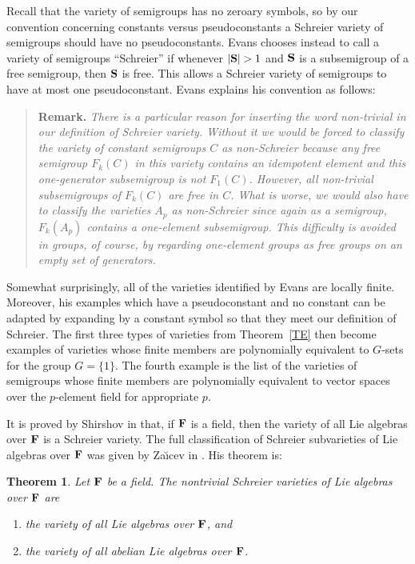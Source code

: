 \documentclass[12pt]{amsart}
\newtheorem{thm}{Theorem}[section] %
\theoremstyle{definition}
\numberwithin{equation}{section}
\newcommand{\m}[1]{{\mathbf{\uppercase{#1}}}}
\begin{document}
Recall that the variety of semigroups has
no zeroary symbols, so by our convention concerning
constants versus pseudoconstants a Schreier variety
of semigroups should have no pseudoconstants.
Evans chooses instead to
call a variety of semigroups ``Schreier'' if
whenever $|\m s|>1$ and $\m s$ is a
subsemigroup of a free semigroup, then $\m s$
is free. This allows a Schreier variety of semigroups
to have at most one pseudoconstant.
Evans explains his convention as follows:
\smallskip

\begin{quote}
{\bf Remark.} {\it There is a particular reason for inserting the
    word \emph{non-trivial} in
our definition of Schreier variety. Without it we would be forced to classify
the variety of constant semigroups $C$ as non-Schreier because any free
semigroup $F_k(C)$ in this variety contains an idempotent element and this
one-generator subsemigroup is not $F_1(C)$.
However, all non-trivial subsemigroups
of $F_k(C)$ are free in $C$. What is worse,
we would also have to classify the varieties
$A_p$ as non-Schreier since again as a semigroup,
$F_k(A_p)$ contains a one-element
subsemigroup. This difficulty is avoided in groups,
of course, by regarding one-element groups as
free groups on an empty set of generators.}
\end{quote}
\smallskip

Somewhat surprisingly, all of the varieties
identified by Evans are locally finite.
Moreover, his examples which have a pseudoconstant
and no constant can be adapted by expanding by
a constant symbol so that they meet our definition
of Schreier.
The first three types
of varieties from Theorem~\ref{TE}
then become examples of varieties whose finite
members are polynomially equivalent to $G$-sets
for the group $G=\{1\}$.
The fourth example is the list of the varieties of semigroups
whose finite members are polynomially equivalent
to vector spaces over the $p$-element field
for appropriate $p$.
\bigskip

It is proved by Shirshov in \cite{shirshov} that, if $\m f$ is a field,
then the variety of all Lie algebras over $\m f$
is a Schreier variety. The full classification
of Schreier subvarieties of Lie algebras over $\m f$ was given by 
Za\u{\i}cev in \cite{zaitsev}. His theorem is:

\begin{thm} \label{NM}
  Let $\m f$ be a field. The nontrivial
  Schreier varieties of Lie algebras over $\m f$ are 
\begin{enumerate}
\item the variety of all Lie algebras over $\m f$, and
\item the variety of all abelian Lie algebras over $\m f$.
\end{enumerate}
\end{thm}
\end{document}
